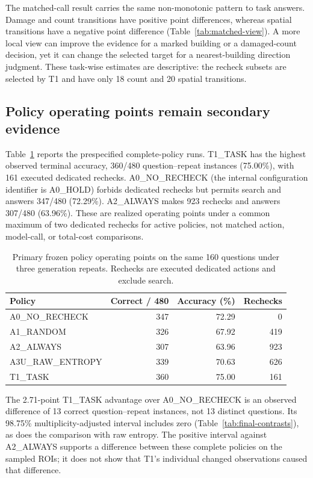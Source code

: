 The matched-call result carries the same non-monotonic pattern to task answers. Damage and count transitions have positive point differences, whereas spatial transitions have a negative point difference (Table~\ref{tab:matched-view}). A more local view can improve the evidence for a marked building or a damaged-count decision, yet it can change the selected target for a nearest-building direction judgment. These task-wise estimates are descriptive: the recheck subsets are selected by T1 and have only 18 count and 20 spatial transitions.

\subsection{Policy operating points remain secondary evidence}
Table~\ref{tab:final-policies} reports the prespecified complete-policy runs. T1\_TASK has the highest observed terminal accuracy, 360/480 question--repeat instances (75.00\%), with 161 executed dedicated rechecks. A0\_NO\_RECHECK (the internal configuration identifier is A0\_HOLD) forbids dedicated rechecks but permits search and answers 347/480 (72.29\%). A2\_ALWAYS makes 923 rechecks and answers 307/480 (63.96\%). These are realized operating points under a common maximum of two dedicated rechecks for active policies, not matched action, model-call, or total-cost comparisons.

\begin{table}[htbp]
\centering\small
\caption{Primary frozen policy operating points on the same 160 questions under three generation repeats. Rechecks are executed dedicated actions and exclude search.}
\label{tab:final-policies}
\begin{tabular}{lrrr}
\toprule
Policy & Correct / 480 & Accuracy (\%) & Rechecks\\
\midrule
A0\_NO\_RECHECK & 347 & 72.29 & 0\\
A1\_RANDOM & 326 & 67.92 & 419\\
A2\_ALWAYS & 307 & 63.96 & 923\\
A3U\_RAW\_ENTROPY & 339 & 70.63 & 626\\
T1\_TASK & 360 & 75.00 & 161\\
\bottomrule
\end{tabular}
\end{table}

The 2.71-point T1\_TASK advantage over A0\_NO\_RECHECK is an observed difference of 13 correct question--repeat instances, not 13 distinct questions. Its 98.75\% multiplicity-adjusted interval includes zero (Table~\ref{tab:final-contrasts}), as does the comparison with raw entropy. The positive interval against A2\_ALWAYS supports a difference between these complete policies on the sampled ROIs; it does not show that T1's individual changed observations caused that difference.


